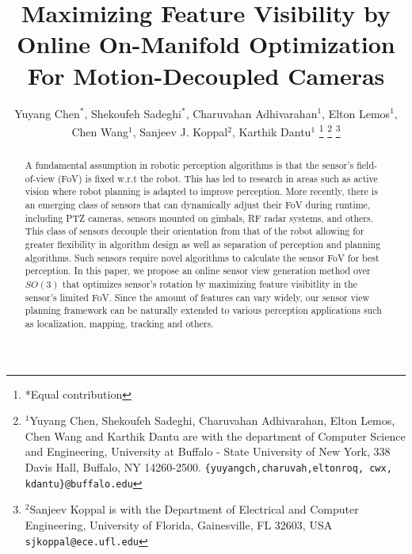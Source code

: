 \documentclass[letterpaper, 10 pt, conference]{ieeeconf}  %
\title{\LARGE \bf Maximizing Feature Visibility by Online On-Manifold Optimization For Motion-Decoupled Cameras}
\author{Yuyang Chen$^{*}$, Shekoufeh Sadeghi$^{*}$, Charuvahan Adhivarahan$^{1}$, Elton Lemos$^{1}$, Chen Wang$^{1}$, Sanjeev J.  Koppal$^{2}$, Karthik Dantu$^{1}$%
\thanks{*Equal contribution}%
\thanks{$^{1}$Yuyang Chen, Shekoufeh Sadeghi, Charuvahan Adhivarahan, Elton Lemos, Chen Wang and Karthik Dantu are with the department of Computer Science and Engineering,
        University at Buffalo - State University of New York, 338 Davis Hall, Buffalo, NY 14260-2500.
        {\tt\small \{yuyangch,charuvah,eltonroq, cwx, kdantu\}@buffalo.edu}}%
\thanks{$^{2}$Sanjeev Koppal is with the Department of Electrical and Computer Engineering, University of Florida, Gainesville, FL 32603, USA
{\tt\small  sjkoppal@ece.ufl.edu}}
}
\begin{document}
\maketitle



\begin{abstract}
A fundamental assumption in robotic perception algorithms is that the sensor's field-of-view (FoV) is fixed w.r.t the robot. This has led to research in areas such as active vision where robot planning is adapted to improve perception. More recently, there is an emerging class of sensors that can dynamically adjust their FoV during runtime, including PTZ cameras, sensors mounted on gimbals, RF radar systems, and others. This class of sensors decouple their orientation from that of the robot allowing for greater flexibility in algorithm design as well as separation of perception and planning algorithms. Such sensors require novel algorithms to calculate the sensor FoV for best perception. In this paper, we propose an online sensor view generation method over $SO(3)$ that optimizes sensor's rotation by maximizing feature visibitlity in the sensor's limited FoV. Since the amount of features can vary widely, our sensor view planning framework can be naturally extended to various perception applications such as localization, mapping, tracking and others.

\end{abstract}
\end{document}
